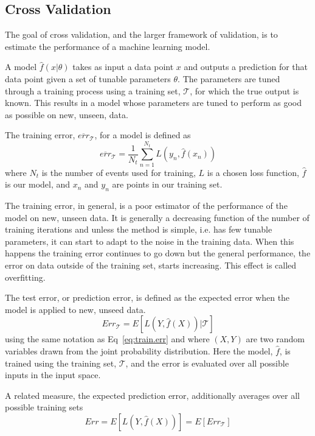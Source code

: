 
\subsection{Cross Validation}
\label{sec:cross:validation}

The goal of cross validation, and the larger framework of validation, is to estimate the performance of a machine learning model.

A model $\hat{f}(x | \theta)$ takes as input a data point $x$ and outputs a prediction for that data point given a set of tunable parameters $\theta$. The parameters are tuned through a training process using a training set, $\mathcal{T}$, for which the true output is known. This results in a model whose parameters are tuned to perform as good as possible on new, unseen, data.

The training error, $\overline{err}_{\mathcal{T}}$, for a model is defined as
\begin{equation}
\overline{err}_{\mathcal{T}} = \frac{1}{N_t}\sum_{n=1}^{N_t}L(y_n, \hat{f}(x_n))
\label{eq:train.err}
\end{equation}
where $N_t$ is the number of events used for training, $L$ is a chosen loss function, $\hat{f}$ is our model, and $x_n$ and $y_n$ are points in our training set.

The training error, in general, is a poor estimator of the performance of the model on new, unseen data. It is generally a decreasing function of the number of training iterations and unless the method is simple, i.e. has few tunable parameters, it can start to adapt to the noise in the training data. When this happens the training error continues to go down but the general performance, the error on data outside of the training set, starts increasing. This effect is called overfitting.

The test error, or prediction error, is defined as the expected error when the model is applied to new, unseed data.
\begin{equation}
Err_{\mathcal{T}} = E\left[L(Y,\hat{f}(X)) | \mathcal{T} \right]
\end{equation}
using the same notation as Eq~\ref{eq:train.err} and where $(X, Y)$ are two random variables drawn from the joint probability distribution. Here the model, $\hat{f}$, is trained using the training set, $\mathcal{T}$, and the error is evaluated over all possible inputs in the input space.

A related measure, the expected prediction error, additionally averages over all possible training sets
\begin{equation}
Err = E\left[L(Y, \hat{f}(X))\right] = E\left[Err_{\mathcal{T}}\right]
\end{equation}

